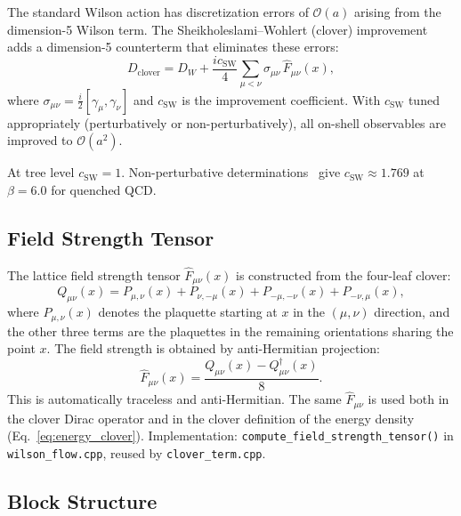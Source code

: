 \documentclass[12pt]{article}
\newcommand{\code}[1]{\texttt{#1}}
\begin{document}
The standard Wilson action has discretization errors of $\mathcal{O}(a)$ arising from the dimension-5 Wilson term. The Sheikholeslami--Wohlert (clover) improvement~\cite{SW1985} adds a dimension-5 counterterm that eliminates these errors:
\begin{equation}
\label{eq:clover_dirac}
D_{\mathrm{clover}} = D_W + \frac{i c_{\mathrm{SW}}}{4} \sum_{\mu < \nu} \sigma_{\mu\nu} \, \hat{F}_{\mu\nu}(x),
\end{equation}
where $\sigma_{\mu\nu} = \frac{i}{2}[\gamma_\mu, \gamma_\nu]$ and $c_{\mathrm{SW}}$ is the improvement coefficient. With $c_{\mathrm{SW}}$ tuned appropriately (perturbatively or non-perturbatively), all on-shell observables are improved to $\mathcal{O}(a^2)$.

At tree level $c_{\mathrm{SW}} = 1$. Non-perturbative determinations~\cite{LuscherSintSommerWeisz1997} give $c_{\mathrm{SW}} \approx 1.769$ at $\beta = 6.0$ for quenched QCD.

\subsection{Field Strength Tensor}
\label{sec:field_strength}

The lattice field strength tensor $\hat{F}_{\mu\nu}(x)$ is constructed from the four-leaf clover:
\begin{equation}
\label{eq:clover_Fmunu}
Q_{\mu\nu}(x) = P_{\mu,\nu}(x) + P_{\nu,-\mu}(x) + P_{-\mu,-\nu}(x) + P_{-\nu,\mu}(x),
\end{equation}
where $P_{\mu,\nu}(x)$ denotes the plaquette starting at $x$ in the $(\mu,\nu)$ direction, and the other three terms are the plaquettes in the remaining orientations sharing the point $x$. The field strength is obtained by anti-Hermitian projection:
\begin{equation}
\hat{F}_{\mu\nu}(x) = \frac{Q_{\mu\nu}(x) - Q_{\mu\nu}^\dagger(x)}{8}.
\end{equation}
This is automatically traceless and anti-Hermitian. The same $\hat{F}_{\mu\nu}$ is used both in the clover Dirac operator and in the clover definition of the energy density (Eq.~\ref{eq:energy_clover}). Implementation: \code{compute\_field\_strength\_tensor()} in \code{wilson\_flow.cpp}, reused by \code{clover\_term.cpp}.

\subsection{Block Structure}
\end{document}
